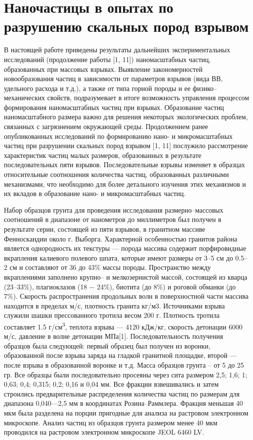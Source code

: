 \chapter{Наночастицы в опытах по разрушению скальных пород взрывом} \label{chapt3}

В настоящей работе приведены результаты дальнейших экспериментальных исследований (продолжение работы [1, 11]) наномасштабных частиц, образованных при массовых взрывах.  Выявление закономерностей новообразования частиц в зависимости от параметров взрывов (вида ВВ, удельного расхода и т.д.), а также от типа горной породы и ее физико–механических свойств, подразумевает в итоге возможность управления процессом формирования наномасштабных частиц при взрывах. Образование частиц наномасштабного размера важно для решения некоторых экологических проблем, связанных с загрязнением окружающей среды.
Продолжением ранее опубликованных исследований по формированию нано- и микромасштабных частиц при разрушении скальных пород взрывом [1, 11] послужило рассмотрение характеристик частиц малых размеров, образованных в результате последовательных пяти взрывов. Последовательные взрывы изменяет в образцах относительные соотношения количества частиц, образованных различными механизмами, что необходимо для более детального изучения этих механизмов и их вкладов в образование нано- и микромасштабных частиц.

Набор образцов грунта для проведения исследования размерно–массовых соотношений в диапазоне от нанометров до миллиметров был получен в результате серии, состоящей из пяти взрывов, в гранитном массиве Фенноскандии около г. Выборга. Характерной особенностью гранитов района является однородность их текстуры — порода массива содержит порфировидные вкрапления калиевого полевого шпата, которые имеют размеры от 3–5 см до 0.5–2 см и составляют от 36 до 43\% массы породы. Пространство между вкраплениями заполнено крупно– и мелкозернистой массой, состоящей из кварца (23–33\%), плагиоклазов (18 − 24\%), биотита (до 8\%) и роговой обманки (до 7\%). Скорость распространения продольных волн в поверхностной части массива находится в пределах   м/с, плотность гранита   кг/м3. Источниками взрыва служили шашки прессованного тротила весом 200 г. Плотность тротила составляет 1.5 г/см\textsuperscript{3}, теплота взрыва — 4120 кДж/кг, скорость детонации 6000 м/с, давление в волне детонации МПа[1]. 
Последовательность получения образцов была следующей: первый образец был получен из воронки, образованной после взрыва заряда на гладкой гранитной площадке, второй — после взрыва в образованной воронке и т.д. Масса образцов грунта – от 5 до 25 гр. Все образцы были последовательно просеяны через сита размером 2,5; 1,6; 1; 0,63; 0,4; 0,315; 0,2; 0,16 и 0,04 мм. Все фракции взвешивались и затем строились предварительные распределения количества частиц по размерам для диапазона 0,040—2,5 мм в координатах Розина–Раммлера. Фракция меньшая 40 мкм была разделена на порции пригодные для анализа на растровом  электронном микроскопе. Анализ частиц из образцов грунта размером менее 40 мкм проводился на растровом электронном микроскопе JEOL 6460 LV.

